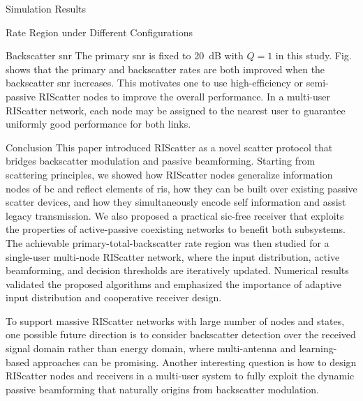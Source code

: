 \begin{section}{Simulation Results}
\begin{subsection}{Rate Region under Different Configurations}
		\begin{subsubsection}{Backscatter \gls{snr}}
			The primary \gls{snr} is fixed to \qty{20}{dB} with $Q=1$ in this study.
			Fig.~ shows that the primary and backscatter rates are both improved when the backscatter \gls{snr} increases.
			This motivates one to use high-efficiency or semi-passive RIScatter nodes to improve the overall performance.
			In a multi-user RIScatter network, each node may be assigned to the nearest user to guarantee uniformly good performance for both links.
		\end{subsubsection}
	\end{subsection}
\end{section}

\begin{section}{Conclusion}
	\label{sc:conclusion}
	This paper introduced RIScatter as a novel scatter protocol that bridges backscatter modulation and passive beamforming.
	Starting from scattering principles, we showed how RIScatter nodes generalize information nodes of \gls{bc} and reflect elements of \gls{ris}, how they can be built over existing passive scatter devices, and how they simultaneously encode self information and assist legacy transmission.
	We also proposed a practical \gls{sic}-free receiver that exploits the properties of active-passive coexisting networks to benefit both subsystems.
	The achievable primary-total-backscatter rate region was then studied for a single-user multi-node RIScatter network, where the input distribution, active beamforming, and decision thresholds are iteratively updated.
	Numerical results validated the proposed algorithms and emphasized the importance of adaptive input distribution and cooperative receiver design.

	To support massive RIScatter networks with large number of nodes and states, one possible future direction is to consider backscatter detection over the received signal domain rather than energy domain, where multi-antenna \cite{Liu2022c} and learning-based approaches can be promising.
	Another interesting question is how to design RIScatter nodes and receivers in a multi-user system to fully exploit the dynamic passive beamforming that naturally origins from backscatter modulation.
\end{section}
